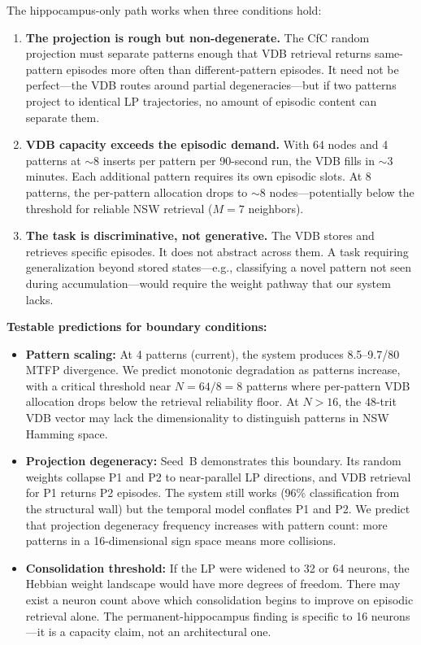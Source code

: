 \documentclass[11pt,letterpaper]{article}
\begin{document}
The hippocampus-only path works when three conditions hold:

\begin{enumerate}
\item \textbf{The projection is rough but non-degenerate.} The CfC random projection must separate patterns enough that VDB retrieval returns same-pattern episodes more often than different-pattern episodes. It need not be perfect---the VDB routes around partial degeneracies---but if two patterns project to identical LP trajectories, no amount of episodic content can separate them.

\item \textbf{VDB capacity exceeds the episodic demand.} With 64 nodes and 4 patterns at $\sim$8 inserts per pattern per 90-second run, the VDB fills in $\sim$3 minutes. Each additional pattern requires its own episodic slots. At 8 patterns, the per-pattern allocation drops to $\sim$8 nodes---potentially below the threshold for reliable NSW retrieval ($M=7$ neighbors).

\item \textbf{The task is discriminative, not generative.} The VDB stores and retrieves specific episodes. It does not abstract across them. A task requiring generalization beyond stored states---e.g., classifying a novel pattern not seen during accumulation---would require the weight pathway that our system lacks.
\end{enumerate}

\textbf{Testable predictions for boundary conditions:}

\begin{itemize}
\item \textbf{Pattern scaling:} At 4 patterns (current), the system produces 8.5--9.7/80 MTFP divergence. We predict monotonic degradation as patterns increase, with a critical threshold near $N = 64 / 8 = 8$ patterns where per-pattern VDB allocation drops below the retrieval reliability floor. At $N > 16$, the 48-trit VDB vector may lack the dimensionality to distinguish patterns in NSW Hamming space.

\item \textbf{Projection degeneracy:} Seed~B demonstrates this boundary. Its random weights collapse P1 and P2 to near-parallel LP directions, and VDB retrieval for P1 returns P2 episodes. The system still works (96\% classification from the structural wall) but the temporal model conflates P1 and P2. We predict that projection degeneracy frequency increases with pattern count: more patterns in a 16-dimensional sign space means more collisions.

\item \textbf{Consolidation threshold:} If the LP were widened to 32 or 64 neurons, the Hebbian weight landscape would have more degrees of freedom. There may exist a neuron count above which consolidation begins to improve on episodic retrieval alone. The permanent-hippocampus finding is specific to 16 neurons---it is a capacity claim, not an architectural one.
\end{itemize}
\end{document}
